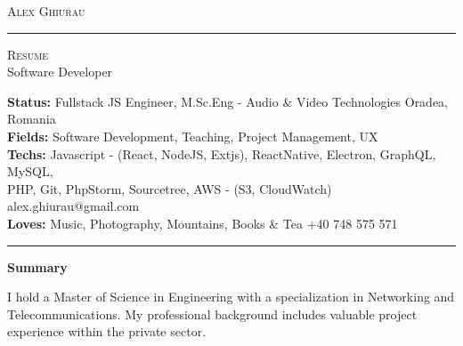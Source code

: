 \documentclass[10pt,A4]{article}
\newcommand{\cvsection}[1]
{
	\begin{center}
		\large\textcolor{sectcol}{\textbf{#1}}
	\end{center}
}
\newcommand{\metasection}[2]
{
\footnotesize{#2} \hspace*{\fill} \footnotesize{#1}\\[1pt]
}
\begin{document}
\pagestyle{fancy}








\vspace{-8pt}
\begin{center}
	\HUGE \textsc{Alex Ghiurau} \textcolor{sectcol}{\rule[-1mm]{1mm}{0.9cm}} \textsc{Resume}\\[2pt]
	\small Software Developer
\end{center}



\vspace{6pt}


\metasection{Oradea, Romania}{\textbf{Status:} Fullstack JS Engineer, M.Sc.Eng - Audio \& Video Technologies}
\metasection{}{\textbf{Fields:} Software Development, Teaching, Project Management, UX}
\metasection{alex.ghiurau@gmail.com}{\textbf{Techs:} Javascript - (React, NodeJS, Extjs), ReactNative, Electron, GraphQL, MySQL, \\ PHP, Git, PhpStorm, Sourcetree, AWS - (S3, CloudWatch)}
\metasection{+40 748 575 571}{\textbf{Loves:} Music, Photography, Mountains, Books \& Tea}
\vspace{-2pt}
\textcolor{softcol}{\hrule}
\vspace{6pt}

\normalsize

\vspace{-6pt}
\cvsection{Summary}
I hold a Master of Science in Engineering with a specialization in Networking and Telecommunications. My professional background includes valuable project experience within the private sector.
\end{document}
